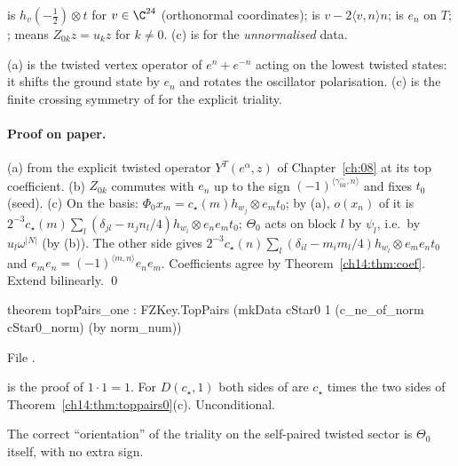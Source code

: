 \begin{dictionary}
 is $h_v(-\tfrac12)\otimes t$ for $v\in\C^{24}$ (orthonormal coordinates);  is
$v-2\langle v,n\rangle n$;  is $e_n$ on $T$; ;  means
$Z_{0k}z=u_kz$ for $k\ne0$.  (c) is for the \emph{unnormalised} data.
\end{dictionary}

\begin{physics}
(a) is the twisted vertex operator of $e^n+e^{-n}$ acting on the lowest twisted states: it shifts the
ground state by $e_n$ and rotates the oscillator polarisation.  (c) is the finite crossing symmetry
of  for the explicit triality.
\end{physics}

\paragraph{Proof on paper.}  (a) from the explicit twisted operator $Y^T(e^\alpha,z)$ of Chapter~\ref{ch:08} at its
top coefficient.  (b) $Z_{0k}$ commutes with $e_n$ up to the sign $(-1)^{\langle\gamma^-_{0k},n\rangle}$ and fixes
$t_0$ (seed).  (c) On the basis: $\Phi_0x_m=c_\star(m)h_{w_j}\otimes e_mt_0$; by (a), $o(x_n)$ of it is
$2^{-3}c_\star(m)\sum_l(\delta_{jl}-n_jn_l/4)h_{w_l}\otimes e_ne_mt_0$; $\Theta_0$ acts on block $l$ by $\psi_l$, i.e.\ by
$u_l\omega^{|N|}$ (by (b)).  The other side gives $2^{-3}c_\star(n)\sum_l(\delta_{il}-m_im_l/4)h_{w_l}\otimes e_me_nt_0$ and
$e_me_n=(-1)^{\langle m,n\rangle}e_ne_m$.  Coefficients agree by Theorem~\ref{ch14:thm:coef}.  Extend
bilinearly. \qed

\begin{theorem}[\lean{TopPairs} with $\varepsilon=+1$]\label{ch14:thm:topone}
\begin{leancode}
theorem topPairs_one :
    FZKey.TopPairs (mkData cStar0 1 (c_ne_of_norm cStar0_norm) (by norm_num))
\end{leancode}
File .
\end{theorem}

\begin{dictionary}
 is the proof of $1\cdot1=1$.  For $D(c_\star,1)$ both sides of  are $c_\star$
times the two sides of Theorem~\ref{ch14:thm:toppairs0}(c).  Unconditional.
\end{dictionary}

\begin{physics}
The correct ``orientation'' of the triality on the self-paired twisted sector is $\Theta_0$ itself,
with no extra sign.
\end{physics}

